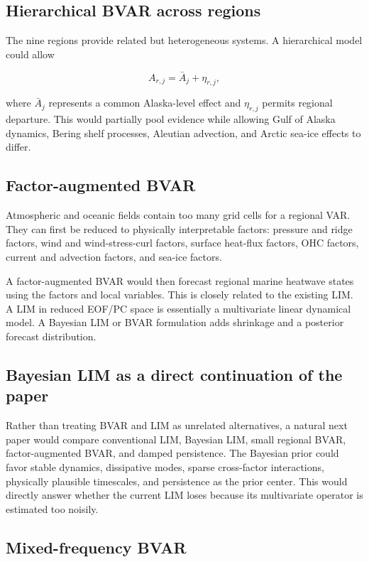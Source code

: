 \documentclass[11pt]{article}
\newcommand{\MHW}{marine heatwave}
\begin{document}
\subsection{Hierarchical BVAR across regions}

The nine regions provide related but heterogeneous systems. A hierarchical model could allow

\begin{equation}
A_{r,j} = \bar A_j+\eta_{r,j},
\end{equation}

where $\bar A_j$ represents a common Alaska-level effect and $\eta_{r,j}$ permits regional departure. This would partially pool evidence while allowing Gulf of Alaska dynamics, Bering shelf processes, Aleutian advection, and Arctic sea-ice effects to differ.

\subsection{Factor-augmented BVAR}

Atmospheric and oceanic fields contain too many grid cells for a regional VAR. They can first be reduced to physically interpretable factors: pressure and ridge factors, wind and wind-stress-curl factors, surface heat-flux factors, OHC factors, current and advection factors, and sea-ice factors.

A factor-augmented BVAR would then forecast regional \MHW{} states using the factors and local variables. This is closely related to the existing LIM. A LIM in reduced EOF/PC space is essentially a multivariate linear dynamical model. A Bayesian LIM or BVAR formulation adds shrinkage and a posterior forecast distribution.

\subsection{Bayesian LIM as a direct continuation of the paper}

Rather than treating BVAR and LIM as unrelated alternatives, a natural next paper would compare conventional LIM, Bayesian LIM, small regional BVAR, factor-augmented BVAR, and damped persistence. The Bayesian prior could favor stable dynamics, dissipative modes, sparse cross-factor interactions, physically plausible timescales, and persistence as the prior center. This would directly answer whether the current LIM loses because its multivariate operator is estimated too noisily.

\subsection{Mixed-frequency BVAR}
\end{document}
